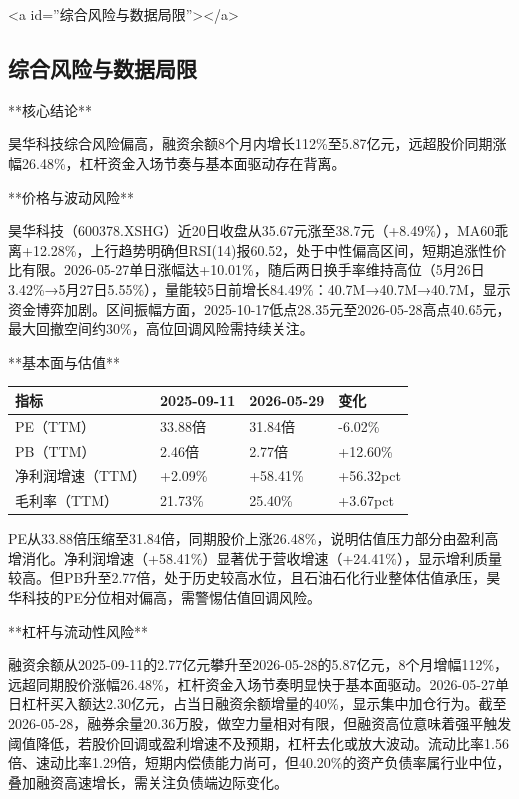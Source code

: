 \documentclass[12pt,a4paper]{article}
\begin{document}
<a id=''综合风险与数据局限''></a>

\subsection{ 综合风险与数据局限}

**核心结论**

昊华科技综合风险偏高，融资余额8个月内增长112\%至5.87亿元，远超股价同期涨幅26.48\%，杠杆资金入场节奏与基本面驱动存在背离。

**价格与波动风险**

昊华科技（600378.XSHG）近20日收盘从35.67元涨至38.7元（+8.49\%），MA60乖离+12.28\%，上行趋势明确但RSI(14)报60.52，处于中性偏高区间，短期追涨性价比有限。2026-05-27单日涨幅达+10.01\%，随后两日换手率维持高位（5月26日3.42\%→5月27日5.55\%），量能较5日前增长84.49\%：40.7M→40.7M→40.7M，显示资金博弈加剧。区间振幅方面，2025-10-17低点28.35元至2026-05-28高点40.65元，最大回撤空间约30\%，高位回调风险需持续关注。

**基本面与估值**

\begin{table}[htbp]
\centering
\begin{tabular}{llll}
\toprule
指标 & 2025-09-11 & 2026-05-29 & 变化 \\
\midrule
PE（TTM） & 33.88倍 & 31.84倍 & -6.02\% \\
PB（TTM） & 2.46倍 & 2.77倍 & +12.60\% \\
净利润增速（TTM） & +2.09\% & +58.41\% & +56.32pct \\
毛利率（TTM） & 21.73\% & 25.40\% & +3.67pct \\
\bottomrule
\end{tabular}
\end{table}


PE从33.88倍压缩至31.84倍，同期股价上涨26.48\%，说明估值压力部分由盈利高增消化。净利润增速（+58.41\%）显著优于营收增速（+24.41\%），显示增利质量较高。但PB升至2.77倍，处于历史较高水位，且石油石化行业整体估值承压，昊华科技的PE分位相对偏高，需警惕估值回调风险。

**杠杆与流动性风险**

融资余额从2025-09-11的2.77亿元攀升至2026-05-28的5.87亿元，8个月增幅112\%，远超同期股价涨幅26.48\%，杠杆资金入场节奏明显快于基本面驱动。2026-05-27单日杠杆买入额达2.30亿元，占当日融资余额增量的40\%，显示集中加仓行为。截至2026-05-28，融券余量20.36万股，做空力量相对有限，但融资高位意味着强平触发阈值降低，若股价回调或盈利增速不及预期，杠杆去化或放大波动。流动比率1.56倍、速动比率1.29倍，短期内偿债能力尚可，但40.20\%的资产负债率属行业中位，叠加融资高速增长，需关注负债端边际变化。
\end{document}
